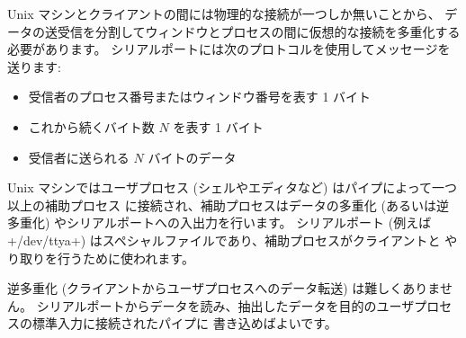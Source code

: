 Unix マシンとクライアントの間には物理的な接続が一つしか無いことから、
データの送受信を分割してウィンドウとプロセスの間に仮想的な接続を多重化する必要があります。
シリアルポートには次のプロトコルを使用してメッセージを送ります:

%
\begin{itemize}
\item 受信者のプロセス番号またはウィンドウ番号を表す 1 バイト
\item これから続くバイト数 $N$ を表す 1 バイト
\item 受信者に送られる $N$ バイトのデータ
\end{itemize}
%
Unix マシンではユーザプロセス (シェルやエディタなど) はパイプによって一つ以上の補助プロセス
に接続され、補助プロセスはデータの多重化 (あるいは逆多重化) やシリアルポートへの入出力を行います。
シリアルポート (例えば \ml+/dev/ttya+) はスペシャルファイルであり、補助プロセスがクライアントと
やり取りを行うために使われます。

逆多重化 (クライアントからユーザプロセスへのデータ転送) は難しくありません。
シリアルポートからデータを読み、抽出したデータを目的のユーザプロセスの標準入力に接続されたパイプに
書き込めばよいです。
%

